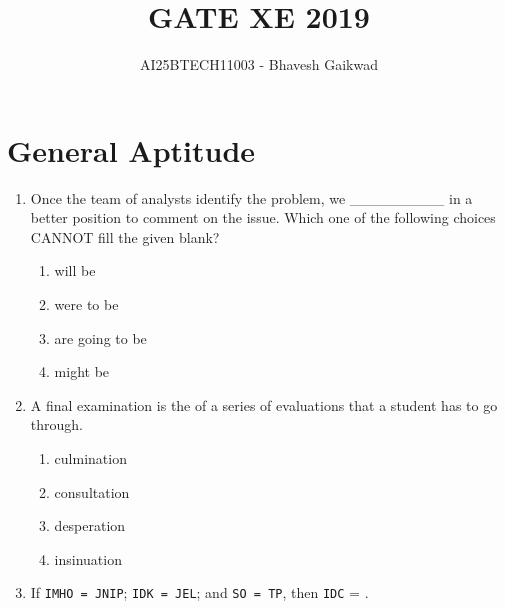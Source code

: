 \documentclass[journal,12pt,onecolumn]{IEEEtran}
\begin{document}
\title{GATE XE 2019}
\author{AI25BTECH11003 - Bhavesh Gaikwad}
\maketitle


\section*{General Aptitude}
\vspace{1cm}

\begin{enumerate}[label=\arabic*)]


\item Once the team of analysts identify the problem, we \_\_\_\_\_\_\_\_\_ in a better position to comment on the issue. Which one of the following choices CANNOT fill the given blank?
\hfill{} \\

\vspace{0.2cm}
\begin{enumerate}[label=\alph*)]
\item will be
\item were to be
\item are going to be
\item might be
\end{enumerate}

\vspace{0.5cm}

\item A final examination is the \underline{\hspace{2cm}} of a series of evaluations that a student has to go through.
\vspace{0.2cm}
\hfill{} \\

\begin{enumerate}[label=\alph*)]
\item culmination
\item consultation
\item desperation
\item insinuation
\end{enumerate}

\vspace{0.5cm}

\item If \texttt{IMHO = JNIP}; \texttt{IDK = JEL}; and \texttt{SO = TP}, then \texttt{IDC} = \underline{\hspace{2cm}}.
\hfill{} \\


\end{enumerate}
\end{document}

